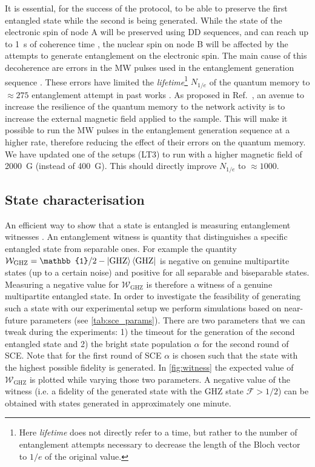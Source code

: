 \documentclass[a4paper]{article}
\begin{document}
It is essential, for the success of the protocol, to be able to preserve the first entangled state while the second is being generated. While the state of the electronic spin of node A will be preserved using \ac{DD} sequences, and can reach up to \SI{1}{s} of coherence time \cite{Abobeih2018}, the nuclear spin on node B will be affected by the attempts to generate entanglement on the electronic spin. The main cause of this decoherence are errors in the \ac{MW} pulses used in the entanglement generation sequence \cite{Kalb2018}. These errors have limited the \emph{lifetime}\footnote{Here \emph{lifetime} does not directly refer to a time, but rather to the number of entanglement attempts necessary to decrease the length of the Bloch vector to $1/e$ of the original value.} $N_{1/e}$ of the quantum memory to $\approx 275$ entanglement attempt in past works \cite{Kalb2017}. As proposed in Ref.~\cite{Kalb2018}, an avenue to increase the resilience of the quantum memory to the network activity is to increase the external magnetic field applied to the sample. This will make it possible to run the \ac{MW} pulses in the entanglement generation sequence at a higher rate, therefore reducing the effect of their errors on the quantum memory. We have updated one of the setups (LT3) to run with a higher magnetic field of \SI{2000}{G} (instead of \SI{400}{G}). This should directly improve $N_{1/e}$ to $\approx 1000$.

\subsection{State characterisation}

An efficient way to show that a state is entangled is measuring entanglement witnesses \cite{Guehne2009}. An entanglement witness is quantity that distinguishes  a specific entangled state from separable ones. For example the quantity $\mathcal W_\text{GHZ} = \mathbb{1}/2 - \ket{\text{GHZ}}\bra{\text{GHZ}}$ is negative on genuine multipartite states (up to a certain noise) and positive for all separable and biseparable states. Measuring a negative value for $\mathcal W_\text{GHZ}$ is therefore a witness of a genuine multipartite entangled state. In order to investigate the feasibility of generating such a state with our experimental setup we perform simulations based on near-future parameters (see \autoref{tab:sce_params}). There are two parameters that we can tweak during the experiments: 1) the timeout for the generation of the second entangled state and 2) the bright state population $\alpha$ for the second round of \ac{SCE}. Note that for the first round of \ac{SCE} $\alpha$ is chosen such that the state with the highest possible fidelity is generated. In \autoref{fig:witness} the expected value of $\mathcal W_\text{GHZ}$  is plotted while varying those two parameters. A negative value of the witness (i.e. a fidelity of the generated state with the GHZ state $\mathcal{F} > 1/2$) can be obtained with states generated in approximately one minute.
\end{document}
